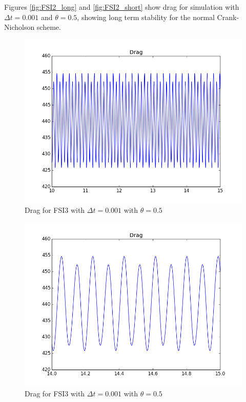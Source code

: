 Figures \ref{fig:FSI2_long} and \ref{fig:FSI2_short} show drag for simulation with $\Delta t = 0.001$ and $\theta = 0.5$, showing long term stability for the normal Crank-Nicholson scheme.

\begin{figure}[H]
  \label{fig:FSI3_long}
  \includegraphics[scale=0.50, trim={0mm 0mm 0mm 0mm},clip]{./Temporal_stability/FSI3_0001_050_big.png}
    \caption {Drag for FSI3 with $\Delta t = 0.001$ with $\theta = 0.5$}
\end{figure}
\begin{figure}[H]
  \label{fig:FSI3_short}
  \includegraphics[scale=0.50, trim={0mm 0mm 0mm 0mm},clip]{./Temporal_stability/FSI3_0001_050_small.png}
    \caption {Drag for FSI3 with $\Delta t = 0.001$ with $\theta = 0.5$}
\end{figure}

